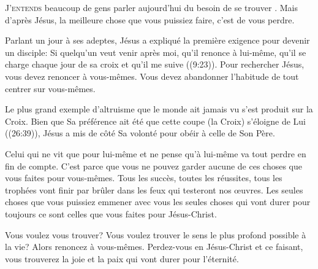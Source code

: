


\lettrine{J}{'entends} beaucoup de gens parler aujourd'hui du besoin
 de \Og se trouver \Fg{}. Mais d'après Jésus, la meilleure chose
 que vous puissiez faire, c'est de vous perdre. 

Parlant un jour à ses adeptes, Jésus a expliqué la première exigence
 pour devenir un disciple: \Og Si quelqu'un veut venir après moi,
 qu'il renonce à lui-même, qu'il se charge chaque jour de sa croix
 et qu'il me suive \Fg{} ((9:23)).
 Pour rechercher Jésus, vous devez renoncer à vous-mêmes.
 Vous devez abandonner l'habitude de tout centrer sur vous-mêmes. 

Le plus grand exemple d'altruisme que le monde ait jamais vu
 s'est produit sur la Croix. Bien que Sa préférence ait été
 que cette coupe (la Croix) s'éloigne de Lui ((26:39)),
 Jésus a mis de côté Sa volonté pour obéir à celle de Son Père. 


Celui qui ne vit que pour lui-même et ne pense qu'à lui-même va tout perdre
 en fin de compte. C'est parce que vous ne pouvez garder aucune
 de ces choses que vous faites pour vous-mêmes. Tous les succès,
 toutes les réussites, tous les trophées vont finir par brûler
 dans les feux qui testeront nos \oe{}uvres. Les seules choses
 que vous puissiez emmener avec vous \ocadr les seules choses
 qui vont durer pour toujours \fcadr{} ce sont celles
 que vous faites pour Jésus-Christ. 

Vous voulez vous trouver? Vous voulez trouver le sens le plus profond
 possible à la vie? Alors renoncez à vous-mêmes. Perdez-vous
 en Jésus-Christ et ce faisant, vous trouverez la joie et la paix
 qui vont durer pour l'éternité. 

\dvrule





